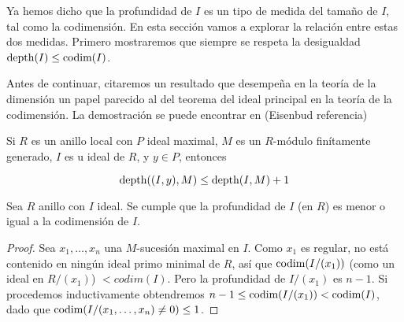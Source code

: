 Ya hemos dicho que la profundidad de $I$ es un tipo de medida del tamaño de $I$, tal como la codimensión. En esta sección vamos a explorar la relación entre estas dos medidas. Primero mostraremos que siempre se respeta la desigualdad $\textrm{depth}(I) \leq \textrm{codim}(I)$.

Antes de continuar, citaremos un resultado que desempeña en la teoría de la dimensión un papel parecido al del teorema del ideal principal en la teoría de la codimensión. La demostración se puede encontrar en (Eisenbud referencia)

\begin{lemma}\label{fixed-depth-localization}
Si $R$ es un anillo local con $P$ ideal maximal, $M$ es un $R$-módulo finítamente generado, $I$ es u ideal de $R$, y $y \in P$, entonces

$$\textrm{depth}((I,y),M) \leq \textrm{depth}(I,M) + 1$$

\end{lemma}

\begin{proposition}\label{depth-leq-codimension}
Sea $R$ anillo con $I$ ideal. Se cumple que la profundidad de $I$ (en $R$) es menor o igual a la codimensión de $I$.
\end{proposition}

\begin{proof}
Sea $x_1,\dots,x_n$ una $M$-sucesión maximal en $I$. Como $x_1$ es regular, no está contenido en ningún ideal primo minimal de $R$, así que $\textrm{codim}(I/(x_1))$ (como un ideal en $R/(x_1)$) $< codim(I)$. Pero la profundidad de $I/(x_1)$ es $n-1$. Si procedemos inductivamente obtendremos $n-1 \leq \textrm{codim}(I/(x_1)) < \textrm{codim}(I)$, dado que $\textrm{codim}(I/(x_1,\dots,x_n) \neq 0) \leq 1$. 
\end{proof}


